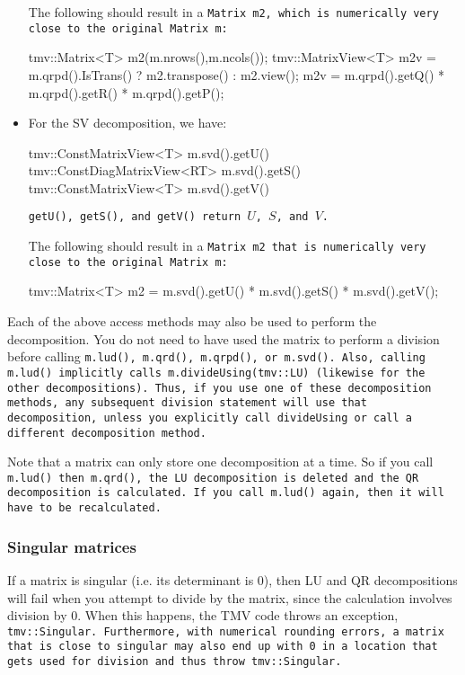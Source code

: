 \begin{itemize}
The following should result in a \tt{Matrix m2}, which is numerically very close to
the original \tt{Matrix m}:
\begin{tmvcode}
tmv::Matrix<T> m2(m.nrows(),m.ncols());
tmv::MatrixView<T> m2v = 
      m.qrpd().IsTrans() ? m2.transpose() : m2.view();
m2v = m.qrpd().getQ() * m.qrpd().getR() * m.qrpd().getP();
\end{tmvcode}

\item
For the SV decomposition, we have:
\begin{tmvcode}
tmv::ConstMatrixView<T> m.svd().getU()
tmv::ConstDiagMatrixView<RT> m.svd().getS()
tmv::ConstMatrixView<T> m.svd().getV()
\end{tmvcode}
\tt{getU()}, \tt{getS()}, and \tt{getV()} return $U$, $S$, and $V$.

The following should result in a \tt{Matrix m2}
that is numerically very close to the original \tt{Matrix m}:
\begin{tmvcode}
tmv::Matrix<T> m2 = m.svd().getU() * m.svd().getS() * m.svd().getV();
\end{tmvcode}
\end{itemize}

Each of the above access methods may also be used to perform the decomposition.
You do not need to have used the matrix to perform a division before
calling \tt{m.lud()}, \tt{m.qrd()}, \tt{m.qrpd()}, or \tt{m.svd()}.  Also, calling
\tt{m.lud()} implicitly calls \tt{m.divideUsing(tmv::LU)} (likewise for the other 
decompositions).  Thus, if you use one of these decomposition methods, any
subsequent division statement will use that decomposition, unless you explicitly
call \tt{divideUsing} or call a different decomposition method.

Note that a matrix can only store one decomposition at a time.  So if you 
call \tt{m.lud()} then \tt{m.qrd()}, the LU decomposition is deleted
and the QR decomposition is calculated.  If you call \tt{m.lud()} again, then 
it will have to be recalculated.

\subsubsection{Singular matrices}
\label{Matrix_Division_Singular}

If a matrix is singular (i.e. its determinant is 0), 
then LU and QR decompositions
will fail when you attempt to divide by the matrix, since the 
calculation involves division by 0.  When this happens, the TMV code
throws an exception,
\tt{tmv::Singular}. 
Furthermore, with numerical rounding errors, a matrix
that is close to singular may also end up with 0 in a location that gets
used for division and thus throw \tt{tmv::Singular}.

